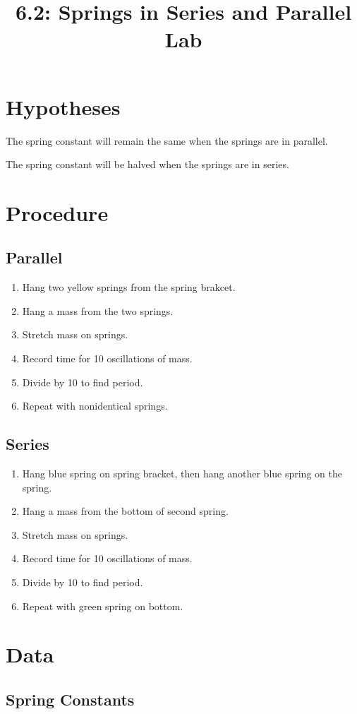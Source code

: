 \documentclass{article}
\title{6.2: Springs in Series and Parallel Lab}
\begin{document}
\section{Hypotheses}
The spring constant will remain the same when the springs are in parallel.

\noindent
The spring constant will be halved when the springs are in series.
\section{Procedure}
\subsection{Parallel}
\begin{enumerate}
    \item Hang two yellow springs from the spring brakcet.
    \item Hang a mass from the two springs.
    \item Stretch mass on springs.
    \item Record time for 10 oscillations of mass.
    \item Divide by 10 to find period.
    \item Repeat with nonidentical springs.
\end{enumerate}
\subsection{Series}
\begin{enumerate}
    \item Hang blue spring on spring bracket, then hang another blue spring on the spring.
    \item Hang a mass from the bottom of second spring.
    \item Stretch mass on springs.
    \item Record time for 10 oscillations of mass.
    \item Divide by 10 to find period.
    \item Repeat with green spring on bottom.
\end{enumerate}
\section{Data}
\subsection{Spring Constants}
\begin{center}
\end{center}
\end{document}
